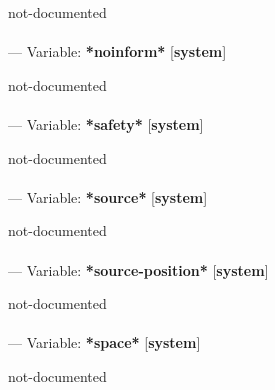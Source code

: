 \begin{adjustwidth}{5em}{5em}
not-documented
\end{adjustwidth}

\paragraph{}
\label{SYSTEM:*NOINFORM*}
--- Variable: \textbf{*noinform*} [\textbf{system}] \textit{}

\begin{adjustwidth}{5em}{5em}
not-documented
\end{adjustwidth}

\paragraph{}
\label{SYSTEM:*SAFETY*}
--- Variable: \textbf{*safety*} [\textbf{system}] \textit{}

\begin{adjustwidth}{5em}{5em}
not-documented
\end{adjustwidth}

\paragraph{}
\label{SYSTEM:*SOURCE*}
--- Variable: \textbf{*source*} [\textbf{system}] \textit{}

\begin{adjustwidth}{5em}{5em}
not-documented
\end{adjustwidth}

\paragraph{}
\label{SYSTEM:*SOURCE-POSITION*}
--- Variable: \textbf{*source-position*} [\textbf{system}] \textit{}

\begin{adjustwidth}{5em}{5em}
not-documented
\end{adjustwidth}

\paragraph{}
\label{SYSTEM:*SPACE*}
--- Variable: \textbf{*space*} [\textbf{system}] \textit{}

\begin{adjustwidth}{5em}{5em}
not-documented
\end{adjustwidth}

